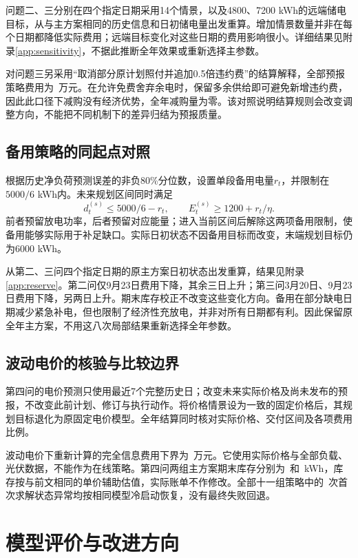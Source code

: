 问题二、三分别在四个指定日期采用14个情景，以及4800、7200 kWh的远端储电目标，从与主方案相同的历史信息和日初储电量出发重算。增加情景数量并非在每个日期都降低实际费用；远端目标变化对这些日期的费用影响很小。详细结果见附录\ref{app:sensitivity}，不据此推断全年效果或重新选择主参数。

对问题三另采用“取消部分原计划照付并追加0.5倍违约费”的结算解释，全部预报策略费用为\QthreeLiteralCost\ 万元。在允许免费舍弃余电时，保留多余供给即可避免新增违约费，因此此口径下减购没有经济优势，全年减购量为零。该对照说明结算规则会改变调整方向，不能把不同机制下的差异归结为预报质量。

\subsection{备用策略的同起点对照}
根据历史净负荷预测误差的非负80\%分位数，设置单段备用电量$r_t$，并限制在$5000/6$ kWh内。未来规划区间同时满足
\begin{equation}
d_t^{(s)}\le5000/6-r_t,\qquad E_t^{(s)}\ge1200+r_t/\eta.
\end{equation}
前者预留放电功率，后者预留对应能量；进入当前区间后解除这两项备用限制，使备用能够实际用于补足缺口。实际日初状态不因备用目标而改变，末端规划目标仍为6000 kWh。

从第二、三问四个指定日期的原主方案日初状态出发重算，结果见附录\ref{app:reserve}。第二问仅9月23日费用下降，其余三日上升；第三问3月20日、9月23日费用下降，另两日上升。期末库存校正不改变这些变化方向。备用在部分缺电日期减少紧急补电，但也限制了经济性充放电，并非对所有日期都有利。因此保留原全年主方案，不用这八次局部结果重新选择全年参数。

\subsection{波动电价的核验与比较边界}
第四问的电价预测只使用最近7个完整历史日；改变未来实际价格及尚未发布的预报，不改变此前计划、修订与执行动作。将价格情景设为一致的固定价格后，其规划目标退化为原固定电价模型。全年结算同时核对实际价格、交付区间及各项费用比例。

波动电价下重新计算的完全信息费用下界为\QfourLower\ 万元。它使用实际价格与全部负载、光伏数据，不能作为在线策略。第四问两组主方案期末库存分别为\QfourTwoEnd\ 和\QfourThreeEnd\ kWh，库存按与前文相同的单价辅助估值，实际账单不作修改。全部十一组策略中的\QfourRecoveries\ 次首次求解状态异常均按相同模型冷启动恢复，没有最终失败回退。

\section{模型评价与改进方向}
